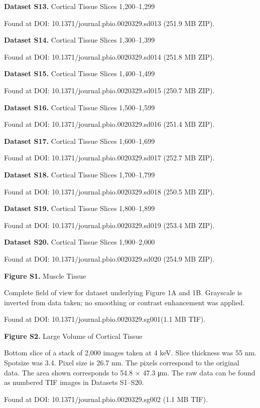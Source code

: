 \documentclass{article}
\begin{document}
\noindent \textbf{Dataset S13.} Cortical Tissue Slices 1,200–1,299\par
\noindent Found at DOI: 10.1371/journal.pbio.0020329.sd013 (251.9 MB ZIP).

\noindent \textbf{Dataset S14.} Cortical Tissue Slices 1,300–1,399\par
\noindent Found at DOI: 10.1371/journal.pbio.0020329.sd014 (251.8 MB ZIP).

\noindent \textbf{Dataset S15.} Cortical Tissue Slices 1,400–1,499\par
\noindent Found at DOI: 10.1371/journal.pbio.0020329.sd015 (250.7 MB ZIP).

\noindent \textbf{Dataset S16.} Cortical Tissue Slices 1,500–1,599\par
\noindent Found at DOI: 10.1371/journal.pbio.0020329.sd016 (251.4 MB ZIP).

\noindent \textbf{Dataset S17.} Cortical Tissue Slices 1,600–1,699\par
\noindent Found at DOI: 10.1371/journal.pbio.0020329.sd017 (252.7 MB ZIP).

\noindent \textbf{Dataset S18.} Cortical Tissue Slices 1,700–1,799\par
\noindent Found at DOI: 10.1371/journal.pbio.0020329.sd018 (250.5 MB ZIP).

\noindent \textbf{Dataset S19.} Cortical Tissue Slices 1,800–1,899\par
\noindent Found at DOI: 10.1371/journal.pbio.0020329.sd019 (253.4 MB ZIP).

\noindent \textbf{Dataset S20.} Cortical Tissue Slices 1,900–2,000\par
\noindent Found at DOI: 10.1371/journal.pbio.0020329.sd020 (254.9 MB ZIP).

\noindent \textbf{Figure S1.} Muscle Tissue\par
\noindent Complete field of view for dataset underlying Figure 1A and 1B. Grayscale is inverted from data taken; no smoothing or contrast enhancement was applied.\par
\noindent Found at DOI: 10.1371/journal.pbio.0020329.sg001(1.1 MB TIF).

\noindent \textbf{Figure S2.} Large Volume of Cortical Tissue\par
\noindent Bottom slice of a stack of 2,000 images taken at 4 keV. Slice thickness was 55 nm. Spotsize was 3.4. Pixel size is 26.7 nm. The pixels correspond to the original data. The area shown corresponds to 54.8 × 47.3 μm. The raw data can be found as numbered TIF images in Datasets S1–S20.\par
\noindent Found at DOI: 10.1371/journal.pbio.0020329.sg002 (1.1 MB TIF).
\end{document}
